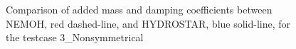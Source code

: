 \documentclass[12pt,a4paper,titlepage]{article}
\begin{document}
\begin{figure}[ht!]
\centering
{}
\caption{Comparison of added mass and damping coefficients between NEMOH, red dashed-line, and HYDROSTAR, blue solid-line, for the testcase 3\_Nonsymmetrical}\label{fig:NonSymmetrical_massdamp}
\end{figure}
\end{document}
